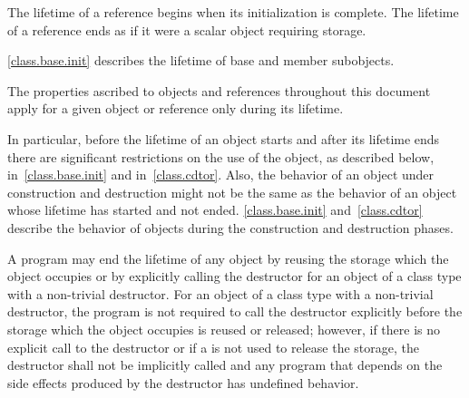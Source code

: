 \pnum
{}%
The lifetime of a reference begins when its initialization is complete.
The lifetime of a reference ends as if it were a scalar object requiring storage.

\pnum
\begin{note} \ref{class.base.init}
describes the lifetime of base and member subobjects. \end{note}

\pnum
The properties ascribed to objects and references throughout this document
apply for a given object or reference only during its lifetime. \begin{note}
In particular, before the lifetime of an object starts and after its
lifetime ends there are significant restrictions on the use of the
object, as described below, in~\ref{class.base.init} and
in~\ref{class.cdtor}. Also, the behavior of an object under construction
and destruction might not be the same as the behavior of an object whose
lifetime has started and not ended. \ref{class.base.init}
and~\ref{class.cdtor} describe the behavior of objects during the
construction and destruction phases. \end{note}

\pnum
A program may end the lifetime of any object by reusing the storage
which the object occupies or by explicitly calling the destructor for an
object of a class type with a non-trivial destructor. For an object of a
class type with a non-trivial destructor, the program is not required to
call the destructor explicitly before the storage which the object
occupies is reused or released; however, if there is no explicit call to
the destructor or if a 
is not used to release the storage, the destructor shall not be
implicitly called and any program that depends on the side effects
produced by the destructor has undefined behavior.

